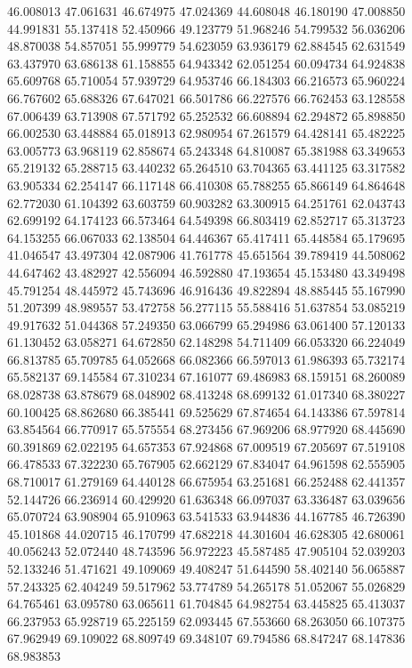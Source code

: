 46.008013
47.061631
46.674975
47.024369
44.608048
46.180190
47.008850
44.991831
55.137418
52.450966
49.123779
51.968246
54.799532
56.036206
48.870038
54.857051
55.999779
54.623059
63.936179
62.884545
62.631549
63.437970
63.686138
61.158855
64.943342
62.051254
60.094734
64.924838
65.609768
65.710054
57.939729
64.953746
66.184303
66.216573
65.960224
66.767602
65.688326
67.647021
66.501786
66.227576
66.762453
63.128558
67.006439
63.713908
67.571792
65.252532
66.608894
62.294872
65.898850
66.002530
63.448884
65.018913
62.980954
67.261579
64.428141
65.482225
63.005773
63.968119
62.858674
65.243348
64.810087
65.381988
63.349653
65.219132
65.288715
63.440232
65.264510
63.704365
63.441125
63.317582
63.905334
62.254147
66.117148
66.410308
65.788255
65.866149
64.864648
62.772030
61.104392
63.603759
60.903282
63.300915
64.251761
62.043743
62.699192
64.174123
66.573464
64.549398
66.803419
62.852717
65.313723
64.153255
66.067033
62.138504
64.446367
65.417411
65.448584
65.179695
41.046547
43.497304
42.087906
41.761778
45.651564
39.789419
44.508062
44.647462
43.482927
42.556094
46.592880
47.193654
45.153480
43.349498
45.791254
48.445972
45.743696
46.916436
49.822894
48.885445
55.167990
51.207399
48.989557
53.472758
56.277115
55.588416
51.637854
53.085219
49.917632
51.044368
57.249350
63.066799
65.294986
63.061400
57.120133
61.130452
63.058271
64.672850
62.148298
54.711409
66.053320
66.224049
66.813785
65.709785
64.052668
66.082366
66.597013
61.986393
65.732174
65.582137
69.145584
67.310234
67.161077
69.486983
68.159151
68.260089
68.028738
63.878679
68.048902
68.413248
68.699132
61.017340
68.380227
60.100425
68.862680
66.385441
69.525629
67.874654
64.143386
67.597814
63.854564
66.770917
65.575554
68.273456
67.969206
68.977920
68.445690
60.391869
62.022195
64.657353
67.924868
67.009519
67.205697
67.519108
66.478533
67.322230
65.767905
62.662129
67.834047
64.961598
62.555905
68.710017
61.279169
64.440128
66.675954
63.251681
66.252488
62.441357
52.144726
66.236914
60.429920
61.636348
66.097037
63.336487
63.039656
65.070724
63.908904
65.910963
63.541533
63.944836
44.167785
46.726390
45.101868
44.020715
46.170799
47.682218
44.301604
46.628305
42.680061
40.056243
52.072440
48.743596
56.972223
45.587485
47.905104
52.039203
52.133246
51.471621
49.109069
49.408247
51.644590
58.402140
56.065887
57.243325
62.404249
59.517962
53.774789
54.265178
51.052067
55.026829
64.765461
63.095780
63.065611
61.704845
64.982754
63.445825
65.413037
66.237953
65.928719
65.225159
62.093445
67.553660
68.263050
66.107375
67.962949
69.109022
68.809749
69.348107
69.794586
68.847247
68.147836
68.983853
